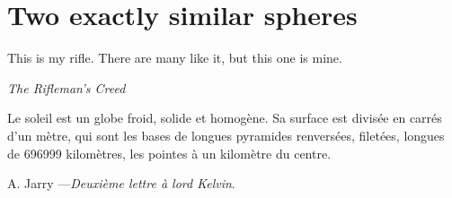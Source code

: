 \documentclass{amsart}
\begin{document}
\section{Two exactly similar spheres}
\epigraph{This is my rifle. There are many like it, but this one is mine.}{\emph{The Rifleman's Creed}}
\epigraph{Le soleil est un globe froid, solide et homogène. Sa surface est divisée en carrés d’un mètre, qui sont les bases de longues pyramides renversées, filetées, longues de 696999 kilomètres, les pointes à un kilomètre du centre. }{A. Jarry ---\emph{Deuxième lettre à lord Kelvin}.}
\end{document}
